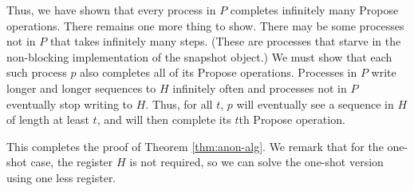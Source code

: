 \documentclass[11pt]{article}
\begin{document}
Thus, we have shown that every process in $P$ completes infinitely many {\sc Propose} operations.
There remains one more thing to show.  There may be some processes not in $P$
that takes infinitely many steps.  (These are processes that starve in the
non-blocking implementation of the snapshot object.)
We must show that each such process $p$ also completes all of its {\sc Propose} operations.
Processes in $P$ write longer and longer sequences to $H$ infinitely often and processes not in $P$ eventually stop writing to $H$.
Thus, for all $t$, $p$ will eventually see a sequence in $H$ of length at least $t$,
and will then complete its $t$th {\sc Propose} operation.

This completes the proof of Theorem \ref{thm:anon-alg}.
We remark that for the one-shot case, the register $H$ is not
required, so we can solve the one-shot version using one less register.
 
\end{document}

